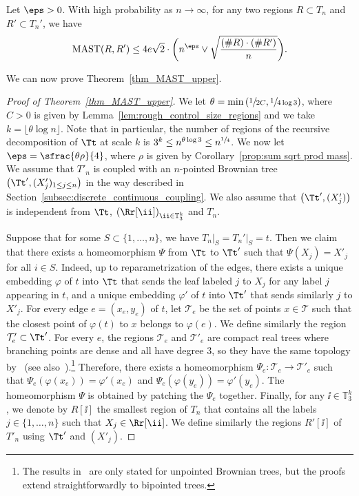 \begin{lemma}\label{lem:bound mast of two regions}
Let $\eps>0$. With high probability as $n\rightarrow \infty$, for any two regions $R\subset T_n$ and $R'\subset T_n'$, we have\vspace*{-3pt}
\begin{align}\label{eqn_general_sqrt_bound}
\mathrm{MAST}(R,R') \leq 4e\sqrt{2} \cdot \biggl( n^\eps \vee \sqrt{\frac{(\#R)\cdot (\#R')}{n}} \biggr).
\end{align}
\end{lemma}

We can now prove Theorem~\ref{thm_MAST_upper}.
\begin{proof}[Proof of Theorem~\ref{thm_MAST_upper}]
We let $\theta= \min \left( \sfrac{1}{2C}, \sfrac{1}{4 \log 3} \right)$, where $C>0$ is given by Lemma~\ref{lem:rough_control_size_regions} and we take $k=\lfloor \theta \log n \rfloor$. Note that in particular, the number of regions of the recursive decomposition of $\Tt$ at scale $k$ is $3^k\leq n^{\theta \log 3} \leq n^{\sfrac{1}{4}}$.
We now let $\eps =\sfrac{\theta \rho}{4}$, where $\rho$ is given by Corollary~\ref{prop:sum sqrt prod mass}. We assume that $T'_n$ is coupled with an $n$-pointed Brownian tree $\left( \Tt', (X'_j)_{1 \leq j \leq n} \right)$ in the way described in Section~\ref{subsec:discrete_continuous_coupling}.
We also assume that $\left(\Tt', (X'_j) \right)$ is independent from $\Tt$, $\left( \Rr[\ii] \right)_{\ii \in \mathbb{T}_3^k}$ and $T_n$.

Suppose that for some $S\subset \{1,\dots, n\}$, we have $T_n\vert_S=T_n'\vert_S=t$. Then we claim that there exists a homeomorphism $\Psi$ from $\Tt$ to $\Tt'$ such that $\Psi(X_j)=X'_j$ for all $i \in S$.
Indeed, up to reparametrization of the edges, there exists a unique embedding $\varphi$ of $t$ into $\Tt$ that sends the leaf labeled $j$ to $X_j$ for any label $j$ appearing in $t$, and a unique embedding $\varphi'$ of $t$ into $\Tt'$ that sends similarly $j$ to $X'_j$. For every edge $e=(x_e,y_e)$ of $t$, let $\mathcal{T}_e$ be the set of points $x \in \mathcal{T}$ such that the closest point of $\varphi(t)$ to $x$ belongs to $\varphi(e)$.
We define similarly the region $\mathcal{T}'_e \subset \Tt'$.
For every $e$, the regions $\mathcal{T}_e$ and $\mathcal{T}'_e$ are compact real trees where branching points are dense and all have degree $3$, so they have the same topology by~\cite[Th.\,1]{BT21} (see also~\cite{CH08}).\footnote{The results in~\cite{BT21} are only stated for unpointed Brownian trees, but the proofs extend straightforwardly to bipointed trees.}
Therefore, there exists a homeomorphism $\Psi_e : \mathcal{T}_e \to \mathcal{T}'_e$ such that $\Psi_e \left( \varphi(x_e) \right)=\varphi'(x_e)$ and $\Psi_e \left( \varphi(y_e) \right)=\varphi'(y_e)$.
The homeomorphism $\Psi$ is obtained by patching the $\Psi_e$ together.
Finally, for any $\ii \in \mathbb{T}_3^k$, we denote by $R[\ii]$ the smallest region of $T_n$ that contains all the labels $j \in \{1,\dots,n\}$ such that $X_j \in \Rr[\ii]$.
We define similarly the regions $R'[\ii]$ of~$T'_n$ using $\Tt'$ and $(X'_j)$.


\end{proof}
